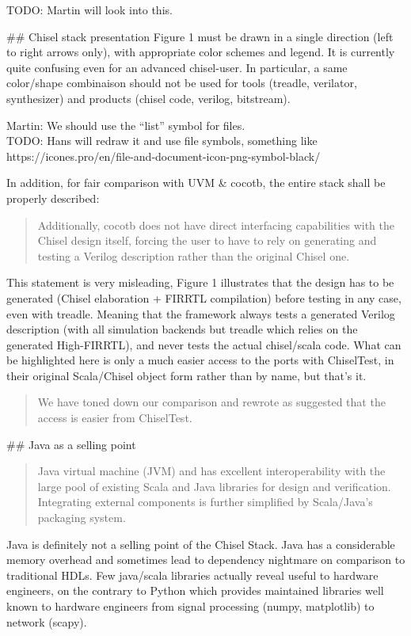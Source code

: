 \documentclass{article}
\newcommand{\todo}[1]{{\color{olive} TODO: #1}}
\newcommand{\martin}[1]{{\color{blue} Martin: #1\\}}
\newcommand{\reply}[1]{{\color{blue} #1}}
\begin{document}
\todo{Martin will look into this.}

\#\# Chisel stack presentation
Figure 1 must be drawn in a single direction (left to right arrows only), with appropriate color schemes and legend. It is currently quite confusing even for an advanced chisel-user.
In particular, a same color/shape combinaison should not be used for tools (treadle, verilator, synthesizer) and products (chisel code, verilog, bitstream).

\martin{We should use the ``list'' symbol for files.}
\todo{Hans will redraw it and use file symbols, something like https://icones.pro/en/file-and-document-icon-png-symbol-black/}


In addition, for fair comparison with UVM \& cocotb, the entire stack shall be properly described:

\begin{quote}
Additionally, cocotb does not have direct interfacing
capabilities with the Chisel design itself, forcing the user to
have to rely on generating and testing a Verilog description
rather than the original Chisel one.
\end{quote}

This statement is very misleading, Figure 1 illustrates that the design has to be generated (Chisel elaboration + FIRRTL compilation) before testing in any case, even with treadle.
Meaning that the framework always tests a generated Verilog description (with all simulation backends but treadle which relies on the generated High-FIRRTL), and never tests the actual chisel/scala code.
What can be highlighted here is only a much easier access to the ports with ChiselTest, in their original Scala/Chisel object form rather than by name, but that's it.

\begin{quote}
\reply{We have toned down our comparison and rewrote as suggested that the access is easier from ChiselTest.}
\end{quote}


\#\# Java as a selling point
\begin{quote}
Java virtual machine (JVM) and has excellent interoperability with
the large pool of existing Scala and Java libraries for design
and verification. Integrating external components is further
simplified by Scala/Java's packaging system.
\end{quote}

Java is definitely not a selling point of the Chisel Stack.
Java has a considerable memory overhead and sometimes lead to dependency nightmare on comparison to traditional HDLs.
Few java/scala libraries actually reveal useful to hardware engineers, on the contrary to Python which provides maintained libraries well known to hardware engineers from signal processing (numpy, matplotlib) to network (scapy).
\end{document}
